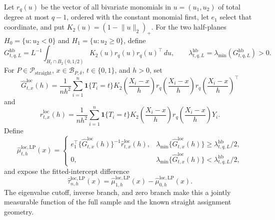 Let \(r_q(u)\) be the vector of all bivariate monomials in
\(u=(u_1,u_2)\) of total degree at most \(q-1\), ordered with the constant
monomial first, let \(e_1\) select that coordinate, and put
\(K_2(u)=(1-\lVert u\rVert_2)_+\).  For the two half-planes
\(H_0=\{u:u_2<0\}\) and \(H_1=\{u:u_2\geq0\}\), define
\[
 G^{\mathrm{hb}}_{t,q,L}
 =L^{-1}\int_{H_t\cap B_2(0,1/2)}
 K_2(u)r_q(u)r_q(u)^\top\,du,
 \qquad
 \lambda^{\mathrm{hb}}_{t,q,L}
 =\lambda_{\min}(G^{\mathrm{hb}}_{t,q,L})>0.
\]
For \(P\in\mathcal P_{\mathrm{straight}}\),
\(x\in\mathcal B_{P,\delta}\), \(t\in\{0,1\}\), and \(h>0\), set
\[
 \widehat G^{\mathrm{loc}}_{t,x}(h)
 =\frac1{nh^2}\sum_{i=1}^n\mathbf1\{T_i=t\}
 K_2\!\left(\frac{X_i-x}{h}\right)
 r_q\!\left(\frac{X_i-x}{h}\right)
 r_q\!\left(\frac{X_i-x}{h}\right)^\top
\]
and
\[
 \widehat r^{\mathrm{loc}}_{t,x}(h)
 =\frac1{nh^2}\sum_{i=1}^n\mathbf1\{T_i=t\}
 K_2\!\left(\frac{X_i-x}{h}\right)
 r_q\!\left(\frac{X_i-x}{h}\right)Y_i.
\]
Define
\[
 \widehat\mu^{\mathrm{loc},\mathrm{LP}}_{t,h}(x)
 =\begin{cases}
 e_1^\top\{\widehat G^{\mathrm{loc}}_{t,x}(h)\}^{-1}
 \widehat r^{\mathrm{loc}}_{t,x}(h),
 &\lambda_{\min}\{\widehat G^{\mathrm{loc}}_{t,x}(h)\}
 \geq\lambda^{\mathrm{hb}}_{t,q,L}/2,\\
 0,&\lambda_{\min}\{\widehat G^{\mathrm{loc}}_{t,x}(h)\}
 <\lambda^{\mathrm{hb}}_{t,q,L}/2,
 \end{cases}
\]
and expose the fitted-intercept difference
\[
 \widehat\tau^{\mathrm{loc},\mathrm{LP}}_{n,h}(x)
 =\widehat\mu^{\mathrm{loc},\mathrm{LP}}_{1,h}(x)
 -\widehat\mu^{\mathrm{loc},\mathrm{LP}}_{0,h}(x).
\]
The eigenvalue cutoff, inverse branch, and zero branch make this a jointly
measurable function of the full sample and the known straight assignment geometry.